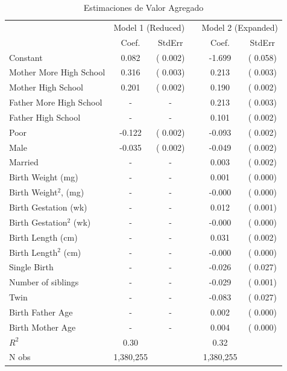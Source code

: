 \documentclass[11pt]{article}
\numberwithin{equation}{section}
\begin{document}
\vspace{0.7cm}
\begin{table}[h!]
\caption{Estimaciones de Valor Agregado}
\begin{center}
 \scriptsize{
\begin{tabular}{lccccc} \hline
& \multicolumn{2}{c}{Model 1 (Reduced)} & &  \multicolumn{2}{c}{Model 2 (Expanded)}  \\ \cline{2-3} \cline{5-6}
    & Coef. & StdErr      & & Coef. &  StdErr    \\ \hline
Constant	   	 &  0.082	 & ( 0.002)	  &  	 & -1.699	 & ( 0.058)	\\
Mother More High School	   	 &  0.316	 & ( 0.003)	   	 & &  0.213	 & ( 0.003)	\\
Mother High School   	   	 &  0.201	 & ( 0.002)	   	 & &  0.190	 & ( 0.002)	\\
Father More High School	   	 & - 	 & - 	   	 & &  0.213	 & ( 0.003)	\\
Father High School	   	 & - 	 & - 	   	 & &  0.101	 & ( 0.002)	\\ \hline
Poor	   	 & -0.122	 & ( 0.002)	   	 & & -0.093	 & ( 0.002)	\\
Male	   	 & -0.035	 & ( 0.002)	   	 & & -0.049	 & ( 0.002)	\\
Married	   	 & - 	 & - 	   	 & &  0.003	 & ( 0.002)	\\
Birth Weight (mg)	   	 & - 	 & - 	   	 & &  0.001	 & ( 0.000)	\\
Birth Weight$^2$, (mg)  	   	 & - 	 & - 	   	 &  & -0.000	 & ( 0.000)	\\
Birth Gestation	(wk)   	 & - 	 & - 	   	 &&  0.012	 & ( 0.001)	\\
Birth Gestation$^2$	(wk)   	 & - 	 & - 	   	 & & -0.000	 & ( 0.000)	\\
Birth Length (cm)	   	 & - 	 & - 	   	&   &  0.031	 & ( 0.002)	\\
Birth Length$^2$ (cm)	   	 & - 	 & - 	   	 & & -0.000	 & ( 0.000)	\\
Single Birth	   	 & - 	 & - 	   	 & & -0.026	 & ( 0.027)	\\
Number of siblings	   	 & - 	 & - 	   	&  & -0.029	 & ( 0.001)	\\
Twin	   	 & - 	 & - 	   & 	 & -0.083	 & ( 0.027)	\\
Birth Father Age	   	 & - 	 & - 	   	&  &  0.002	 & ( 0.000)	\\
Birth Mother Age	   	 & - 	 & - 	   	&  &  0.004	 & ( 0.000)	\\
\hline
$R^2$	  	                    &    0.30  	&	 	  	& &  0.32	 	&	 	      \\
N obs	  	 	                &   1,380,255	&        &    & 1,380,255	&               \\
\hline
\end{tabular}
} 
\end{center}
\end{table}
\end{document}
